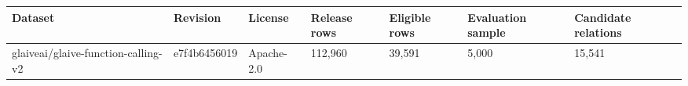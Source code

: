 \begin{tabular}{lllllll}
\toprule
Dataset & Revision & License & Release rows & Eligible rows & Evaluation sample & Candidate relations \\
\midrule
glaiveai/glaive-function-calling-v2 & e7f4b6456019 & Apache-2.0 & 112,960 & 39,591 & 5,000 & 15,541 \\
\bottomrule
\end{tabular}